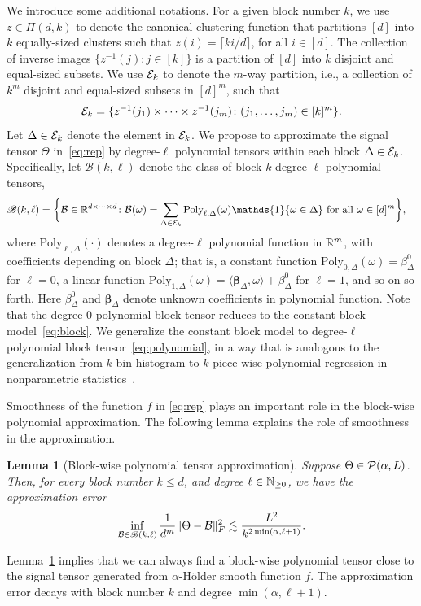 \documentclass[11pt]{article}
\newtheorem{lem}{Lemma}
\theoremstyle{definition}
\def\caliB{\mathscr{B}}
\begin{document}
We introduce some additional notations. For a given block number $k$, we use $z\in\Pi(d,k)$ to denote the canonical clustering function that partitions $[d]$ into $k$ equally-sized clusters such that 
$z(i) = \lceil ki/d\rceil$, for all $i\in[d]$.
The collection of inverse images $\{z^{-1}(j)\colon j\in[k]\}$ is a partition of $[d]$ into $k$ disjoint and equal-sized subsets. We use $\mathcal{E}_k$ to denote the $m$-way partition, i.e., a collection of $k^m$ disjoint and equal-sized subsets in $[d]^m$, such that 
\begin{align}\label{eq:blockind}
    \mathcal{E}_k = \{z^{-1}(j_1)\times\cdots\times z^{-1}(j_m)\colon (j_1,\ldots,j_m)\in [k]^m\}.
\end{align}
Let $\Delta\in \mathcal{E}_k$ denote the element in $\mathcal{E}_k$. We propose to approximate the signal tensor $\Theta$ in~\eqref{eq:rep} by degree-$\ell$ polynomial tensors within each block $\Delta\in \mathcal{E}_k$. Specifically, let $\caliB(k,\ell)$ denote the class of block-$k$ degree-$\ell$ polynomial tensors,
\begin{align}\label{eq:polynomial}
    \caliB(k,\ell) = \bigg\{&\tB\in \bbR^{d\times \cdots \times d}\colon \tB(\omega) = \sum_{\Delta\in\tE_k}\text{Poly}_{\ell,\Delta}(\omega)\mathds{1}\{\omega\in\Delta\}\text{ for all } \omega\in[d]^m\bigg\},
\end{align}
where $\text{Poly}_{\ell,\Delta}(\cdot)$ denotes a degree-$\ell$ polynomial function in $\mathbb{R}^m$, with coefficients depending on block $\Delta$; that is, a constant function $\text{Poly}_{0,\Delta}(\omega)= \beta^0_{\Delta}$ for $\ell=0$, a linear function $\text{Poly}_{1,\Delta}(\omega)=\langle \boldsymbol{\beta}_{\Delta},\omega\rangle+\beta_{\Delta}^0$ for $\ell=1$, and so on so forth. Here $\beta^0_{\Delta}$ and $\boldsymbol{\beta}_{\Delta}$ denote unknown coefficients in polynomial function. Note that the degree-0 polynomial block tensor reduces to the constant block model~\eqref{eq:block}. We generalize the constant block model to degree-$\ell$ polynomial block tensor~\eqref{eq:polynomial}, in a way that is analogous to the generalization from $k$-bin histogram to $k$-piece-wise polynomial regression in nonparametric statistics~\citep{wasserman2006all}.

Smoothness of the function $f$ in \eqref{eq:rep} plays an important role in the block-wise polynomial approximation. The following lemma explains the role of smoothness in the approximation. 

\begin{lem}[Block-wise polynomial tensor approximation]\label{lem:approx}
Suppose  $\Theta\in\mathcal{P}(\alpha,L)$. Then, for every block number $k\leq d$, and degree $\ell\in \mathbb{N}_{\geq 0}$, we have the approximation error
\begin{align}
   \inf_{\tB\in\caliB(k,\ell)} \frac{1}{d^m}\FnormSize{}{\Theta-\tB}^2\lesssim \frac{L^2}{k^{2\min(\alpha,\ell+1)}}.
\end{align}
\end{lem}
Lemma~\ref{lem:approx} implies that we can always find a block-wise polynomial tensor close to the signal tensor generated from $\alpha$-H\"older smooth function $f$. The approximation error decays with block number $k$ and degree $\min(\alpha,\ell+1)$. 
\end{document}
